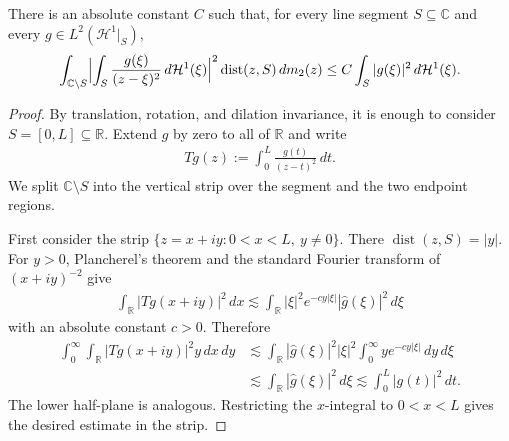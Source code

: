 \documentclass[11pt,a4paper,english,reqno]{amsart}
\newcommand{\hd}[1]{\mathcal{H}^{#1}}
\numberwithin{equation}{section}
\newcommand{\RR}[0]{\mathbb{R}}
\newcommand{\CC}[0]{\mathbb{C}}
\renewcommand{\subset}{\subseteq}
\DeclareMathOperator{\dist}{dist}
\DeclarePairedDelimiter{\abs}{\lvert}{\rvert}
\renewcommand{\restriction}{\big|}
\numberwithin{definition}{section}
\begin{document}
\begin{lemma}
  There is an absolute constant $C$ such that, for every line segment $S\subset\CC$ and every $g\in L^2(\hd1\restriction_S)$,
  \begin{align}\label{eq:segment-usfe-appendix}
    \int_{\CC\setminus S}
    \abs[\Big]{\int_S \frac{g(\xi)}{(z-\xi)^2}\,d\hd1(\xi)}^2
    \dist(z,S)\,dm_2(z)
    \le C\int_S |g(\xi)|^2\,d\hd1(\xi) .
  \end{align}
\end{lemma}
\begin{proof}
  By translation, rotation, and dilation invariance, it is enough to consider $S=[0,L]\subset\RR$.  Extend $g$ by zero to all of $\RR$ and write
  \begin{align}
    Tg(z):=\int_0^L \frac{g(t)}{(z-t)^2}\,dt .
  \end{align}
  We split $\CC\setminus S$ into the vertical strip over the segment and the two endpoint regions.

  First consider the strip $\{z=x+iy:0<x<L,\ y\ne0\}$.  There $\dist(z,S)=|y|$.  For $y>0$, Plancherel's theorem and the standard Fourier transform of $(x+iy)^{-2}$ give
  \begin{align}
    \int_{\RR}|Tg(x+iy)|^2\,dx
    \lesssim
    \int_{\RR}|\xi|^2e^{-c y|\xi|}|\widehat g(\xi)|^2\,d\xi
  \end{align}
  with an absolute constant $c>0$.  Therefore
  \begin{align}
    \int_0^\infty\int_{\RR}|Tg(x+iy)|^2y\,dx\,dy
    &\lesssim
    \int_{\RR}|\widehat g(\xi)|^2|\xi|^2
      \int_0^\infty y e^{-c y|\xi|}\,dy\,d\xi  \\
    &\lesssim \int_{\RR}|\widehat g(\xi)|^2\,d\xi
    \lesssim \int_0^L |g(t)|^2\,dt .
  \end{align}
  The lower half-plane is analogous.
  Restricting the $x$-integral to $0<x<L$ gives the desired estimate in the strip.


\end{proof}
\end{document}
